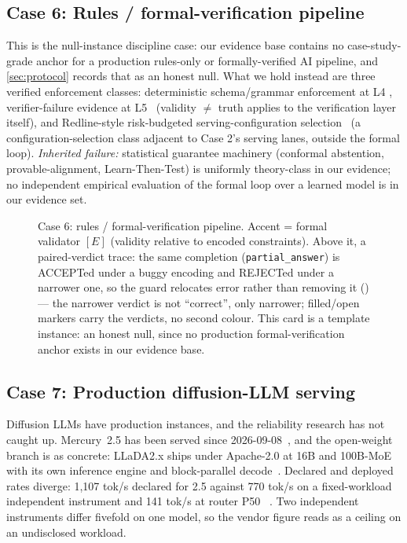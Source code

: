 \subsection{Case 6: Rules / formal-verification pipeline}
\label{sec:case-forms}
This is the null-instance discipline case: our evidence base contains no case-study-grade
anchor for a production rules-only or formally-verified AI pipeline, and \cref{sec:protocol}
records that as an honest null. What we hold instead are three verified enforcement classes:
deterministic schema/grammar enforcement at L4
\cite{id230513971,jsonschemabench2025,xgrammar2024}, verifier-failure evidence at
L5~\cite{id260601066} (validity $\neq$ truth applies to the verification layer itself), and
Redline-style risk-budgeted serving-configuration selection~\cite{id260933887} (a
configuration-selection class adjacent to Case 2's serving lanes, outside the formal
loop). \emph{Inherited failure:} statistical guarantee machinery (conformal abstention,
provable-alignment, Learn-Then-Test) is uniformly theory-class in our evidence; no independent
empirical evaluation of the formal loop over a learned model is in our evidence set.

\begin{figure}[h!]
  \centering
  \resizebox{\linewidth}{!}{}
  \caption{ Case 6: rules / formal-verification pipeline. Accent = formal validator $[E]$ (validity relative to encoded constraints). Above it, a paired-verdict trace: the same completion (\texttt{partial\_answer}) is ACCEPTed under a buggy encoding and REJECTed under a narrower one, so the guard relocates error rather than removing it (\cite{id260601066}) --- the narrower verdict is not ``correct'', only narrower; filled/open markers carry the verdicts, no second colour. This card is a template instance: an honest null, since no production formal-verification anchor exists in our evidence base.}
  \label{fig:case-forms}
\end{figure}

\subsection{Case 7: Production diffusion-LLM serving}
\label{sec:case-diffusion}
Diffusion LLMs have production instances, and the reliability research has not caught up.
Mercury~2.5 has been served since 2026-09-08~\cite{inception2026mercury25}, and the open-weight
branch is as concrete: LLaDA2.x ships under Apache-2.0 at 16B and 100B-MoE with its own inference
engine and block-parallel decode~\cite{llada2026two}. Declared and deployed rates diverge: 1,107
tok/s declared for 2.5 \cite{inception2026mercury25} \evvendor{} against 770 tok/s on a
fixed-workload independent instrument and 141 tok/s at router
P50~\cite{artificialanalysis2026mercury25,openrouter2026mercury} \evindep{}. Two independent
instruments differ fivefold on one model, so the vendor figure reads as a ceiling on an undisclosed
workload.

